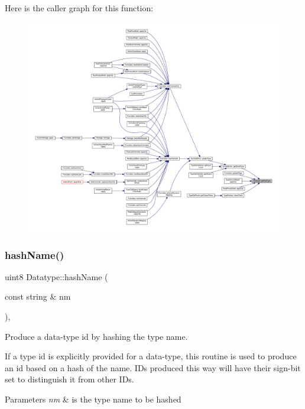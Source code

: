 Here is the caller graph for this function\+:
\nopagebreak
\begin{figure}[H]
\begin{center}
\leavevmode
\includegraphics[width=350pt]{class_datatype_ac310ccfdc47d145f10699fa1e14e73b4_icgraph}
\end{center}
\end{figure}
\mbox{\label{class_datatype_a4733a0e51a359ad324583d06824b5b92}} 
\subsubsection{\texorpdfstring{hashName()}{hashName()}}
{\footnotesize\ttfamily uint8 Datatype\+::hash\+Name (\begin{DoxyParamCaption}\item[{const string \&}]{nm }\end{DoxyParamCaption})\hspace{0.3cm}{\ttfamily [static]}, {\ttfamily [protected]}}



Produce a data-\/type id by hashing the type name. 

If a type id is explicitly provided for a data-\/type, this routine is used to produce an id based on a hash of the name. I\+Ds produced this way will have their sign-\/bit set to distinguish it from other I\+Ds. 
\begin{DoxyParams}{Parameters}
{\em nm} & is the type name to be hashed \\
\hline
\end{DoxyParams}


